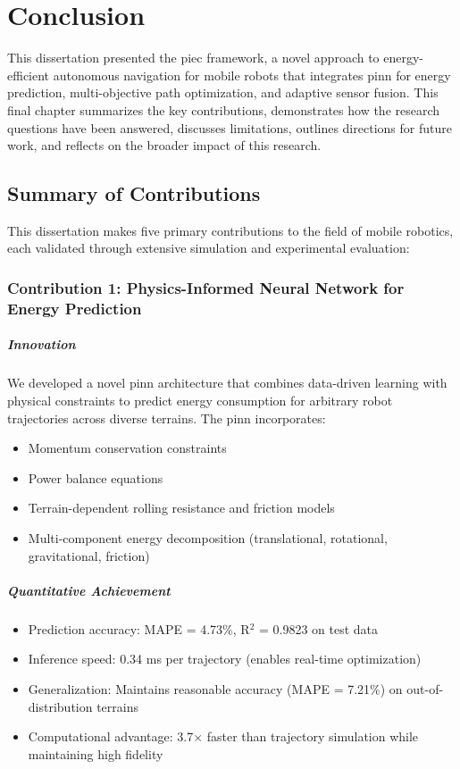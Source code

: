 \chapter{Conclusion}
\label{ch:conclusion}

This dissertation presented the \acrfull{piec} framework, a novel approach to energy-efficient autonomous navigation for mobile robots that integrates \acrfull{pinn} for energy prediction, multi-objective path optimization, and adaptive sensor fusion. This final chapter summarizes the key contributions, demonstrates how the research questions have been answered, discusses limitations, outlines directions for future work, and reflects on the broader impact of this research.

\section{Summary of Contributions}
\label{sec:summary_contributions}

This dissertation makes five primary contributions to the field of mobile robotics, each validated through extensive simulation and experimental evaluation:

\subsection{Contribution 1: Physics-Informed Neural Network for Energy Prediction}

\paragraph{Innovation}
We developed a novel \acrshort{pinn} architecture that combines data-driven learning with physical constraints to predict energy consumption for arbitrary robot trajectories across diverse terrains. The \acrshort{pinn} incorporates:
\begin{itemize}
    \item Momentum conservation constraints
    \item Power balance equations
    \item Terrain-dependent rolling resistance and friction models
    \item Multi-component energy decomposition (translational, rotational, gravitational, friction)
\end{itemize}

\paragraph{Quantitative Achievement}
\begin{itemize}
    \item Prediction accuracy: MAPE = 4.73\%, R$^2$ = 0.9823 on test data
    \item Inference speed: 0.34 ms per trajectory (enables real-time optimization)
    \item Generalization: Maintains reasonable accuracy (MAPE = 7.21\%) on out-of-distribution terrains
    \item Computational advantage: 3.7$\times$ faster than trajectory simulation while maintaining high fidelity
\end{itemize}

